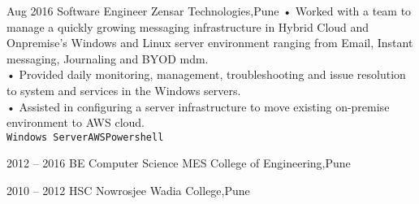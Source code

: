 \documentclass[9pt]{developercv} %
\begin{document}
\begin{entrylist}
	\entry
		{Aug 2016}
		{Software Engineer}
		{Zensar Technologies,Pune}
		{• Worked with a team to manage a quickly growing messaging infrastructure in Hybrid Cloud and Onpremise's Windows and Linux server
environment ranging
from Email, Instant messaging, Journaling and BYOD mdm.\\• Provided daily monitoring, management, troubleshooting and issue resolution to
system and services in the Windows servers.\\ • Assisted in configuring a server infrastructure to move existing on-premise
environment to AWS cloud.\\ \texttt{Windows Server}\slashsep\texttt{AWS}\slashsep\texttt{Powershell}}
\end{entrylist}



\begin{entrylist}
	\entry
		{2012 -- 2016}
		{BE Computer Science}
		{MES College of Engineering,Pune}
		
	\entry
		{2010 -- 2012}
		{HSC}
		{Nowrosjee Wadia College,Pune}
		
\end{entrylist}


\end{document}
